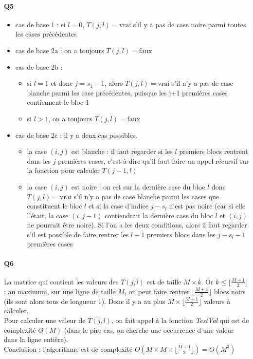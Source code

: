 \documentclass[12pt]{article}
\newcommand{\true}{\text{vrai}}
\newcommand{\false}{\text{faux}}
\begin{document}
			\paragraph{Q5}
			
				\begin{itemize}
					\item cas de base 1 : si $ l=0 $, $ T(j,l) = \true $ s'il y a pas de case noire parmi toutes les cases précédentes
					
					\item cas de base 2a : on a toujours $ T(j,l) = \false $
					
					\item cas de base 2b : \begin{itemize}
						\item si $ l=1 $ et donc $ j = s_1-1$, alors $ T(j,l) = \true $ s'il n'y a pas de case blanche parmi les case précédentes, puisque les j+1 premières cases contiennent le bloc 1
						\item si $ l > 1 $, on a toujours $ T(j,l) = \false $
					\end{itemize} 
					
					\item cas de base 2c : il y a deux cas possibles.
					\begin{itemize}
						\item la case $ (i,j) $ est blanche : il faut regarder si les $ l $ premiers blocs rentrent dans les $ j $ premières cases, c'est-à-dire qu'il faut faire un appel récursif sur la fonction pour calculer $ T(j-1,l) $
						\item la case $ (i,j) $ est noire : on est sur la dernière case du bloc $ l $ donc $ T(j,l) = \true $ s'il n'y a pas de case blanche parmi les cases que constituent le bloc $ l $ et si la case d'indice $ j-s_l $ n'est pas noire (car si elle l'était, la case $ (i,j-1) $ contiendrait la dernière case du bloc $ l $ et $ (i,j) $ ne pourrait être noire). Si l'on a les deux conditions, alors il faut regarder s'il est possible de faire rentrer les $ l-1 $ premiers blocs dans les $ j-s_l-1 $ premières cases
					\end{itemize}
			\end{itemize}
		
		\paragraph{Q6}
			La matrice qui contient les valeurs des $ T(j,l) $ est de taille $ M \times k $. Or $ k \leq \lfloor \frac{M+1}{2} \rfloor $ : au maximum, sur une ligne de taille $ M $, on peut faire rentrer $ \lfloor \frac{M+1}{2} \rfloor $ blocs noirs (ils sont alors tous de longueur 1). Donc il y a au plus $ M \times \lfloor \frac{M+1}{2} \rfloor $ valeurs à calculer. \\
			Pour calculer une valeur de $ T(j,l) $, on fait appel à la fonction \textit{TestVal} qui est de complexité $ O(M) $ (dans le pire cas, on cherche une occurrence d'une valeur dans la ligne entière). \\
			Conclusion : l'algorithme est de complexité $ O(M \times M \times \lfloor \frac{M+1}{2} \rfloor) = \boxed{O(M^3)} $ \\
			
\end{document}
